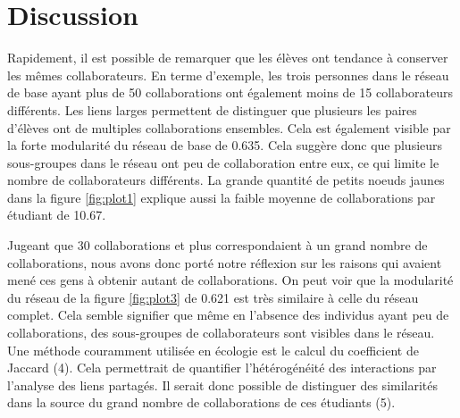 \documentclass[9pt,twocolumn,twoside,]{pnas-new}
\begin{document}
\hypertarget{discussion}{%
\section{Discussion}\label{discussion}}

Rapidement, il est possible de remarquer que les élèves ont tendance à
conserver les mêmes collaborateurs. En terme d'exemple, les trois
personnes dans le réseau de base ayant plus de 50 collaborations ont
également moins de 15 collaborateurs différents. Les liens larges
permettent de distinguer que plusieurs les paires d'élèves ont de
multiples collaborations ensembles. Cela est également visible par la
forte modularité du réseau de base de 0.635. Cela suggère donc que
plusieurs sous-groupes dans le réseau ont peu de collaboration entre
eux, ce qui limite le nombre de collaborateurs différents. La grande
quantité de petits noeuds jaunes dans la figure \ref{fig:plot1} explique
aussi la faible moyenne de collaborations par étudiant de 10.67.

Jugeant que 30 collaborations et plus correspondaient à un grand nombre
de collaborations, nous avons donc porté notre réflexion sur les raisons
qui avaient mené ces gens à obtenir autant de collaborations. On peut
voir que la modularité du réseau de la figure \ref{fig:plot3} de 0.621
est très similaire à celle du réseau complet. Cela semble signifier que
même en l'absence des individus ayant peu de collaborations, des
sous-groupes de collaborateurs sont visibles dans le réseau. Une méthode
couramment utilisée en écologie est le calcul du coefficient de Jaccard
(4). Cela permettrait de quantifier l'hétérogénéité des interactions par
l'analyse des liens partagés. Il serait donc possible de distinguer des
similarités dans la source du grand nombre de collaborations de ces
étudiants (5).
\end{document}
